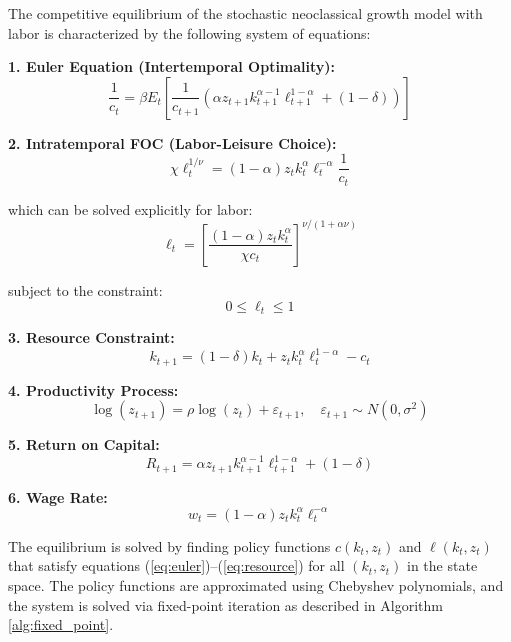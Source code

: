 \documentclass[11pt]{article}
\theoremstyle{definition}
\begin{document}
The competitive equilibrium of the stochastic neoclassical growth model with labor is characterized by the following system of equations:

\textbf{1. Euler Equation (Intertemporal Optimality):}
\begin{equation}
\frac{1}{c_t} = \beta E_t \left[ \frac{1}{c_{t+1}} \left( \alpha z_{t+1} k_{t+1}^{\alpha-1} \ell_{t+1}^{1-\alpha} + (1-\delta) \right) \right]
\label{eq:euler}
\end{equation}

\textbf{2. Intratemporal FOC (Labor-Leisure Choice):}
\begin{equation}
\chi \ell_t^{1/\nu} = (1-\alpha) z_t k_t^{\alpha} \ell_t^{-\alpha} \frac{1}{c_t}
\label{eq:intratemporal}
\end{equation}

which can be solved explicitly for labor:
\begin{equation}
\ell_t = \left[ \frac{(1-\alpha) z_t k_t^{\alpha}}{\chi c_t} \right]^{\nu/(1 + \alpha\nu)}
\label{eq:labor_supply}
\end{equation}

subject to the constraint:
\begin{equation}
0 \leq \ell_t \leq 1
\label{eq:labor_constraint}
\end{equation}

\textbf{3. Resource Constraint:}
\begin{equation}
k_{t+1} = (1-\delta) k_t + z_t k_t^{\alpha} \ell_t^{1-\alpha} - c_t
\label{eq:resource}
\end{equation}

\textbf{4. Productivity Process:}
\begin{equation}
\log(z_{t+1}) = \rho \log(z_t) + \varepsilon_{t+1}, \quad \varepsilon_{t+1} \sim N(0, \sigma^2)
\label{eq:productivity}
\end{equation}

\textbf{5. Return on Capital:}
\begin{equation}
R_{t+1} = \alpha z_{t+1} k_{t+1}^{\alpha-1} \ell_{t+1}^{1-\alpha} + (1-\delta)
\label{eq:return}
\end{equation}

\textbf{6. Wage Rate:}
\begin{equation}
w_t = (1-\alpha) z_t k_t^{\alpha} \ell_t^{-\alpha}
\label{eq:wage}
\end{equation}

The equilibrium is solved by finding policy functions $c(k_t, z_t)$ and $\ell(k_t, z_t)$ that satisfy equations (\ref{eq:euler})--(\ref{eq:resource}) for all $(k_t, z_t)$ in the state space. The policy functions are approximated using Chebyshev polynomials, and the system is solved via fixed-point iteration as described in Algorithm \ref{alg:fixed_point}.
\end{document}
